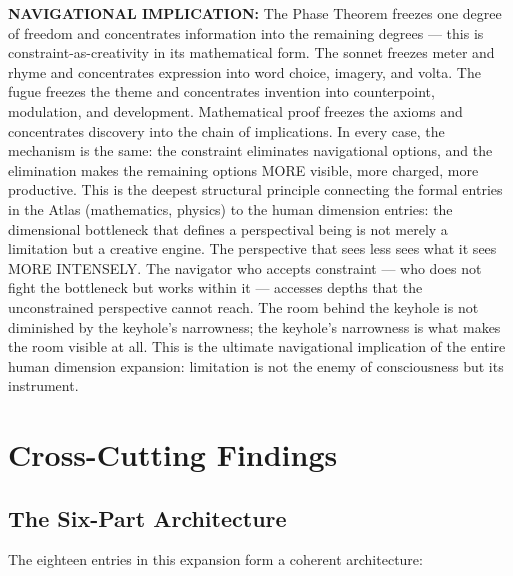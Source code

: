\textbf{NAVIGATIONAL IMPLICATION:} The Phase Theorem freezes one degree of freedom and concentrates information into the remaining degrees — this is constraint-as-creativity in its mathematical form. The sonnet freezes meter and rhyme and concentrates expression into word choice, imagery, and volta. The fugue freezes the theme and concentrates invention into counterpoint, modulation, and development. Mathematical proof freezes the axioms and concentrates discovery into the chain of implications. In every case, the mechanism is the same: the constraint eliminates navigational options, and the elimination makes the remaining options MORE visible, more charged, more productive. This is the deepest structural principle connecting the formal entries in the Atlas (mathematics, physics) to the human dimension entries: the dimensional bottleneck that defines a perspectival being is not merely a limitation but a creative engine. The perspective that sees less sees what it sees MORE INTENSELY. The navigator who accepts constraint — who does not fight the bottleneck but works within it — accesses depths that the unconstrained perspective cannot reach. The room behind the keyhole is not diminished by the keyhole's narrowness; the keyhole's narrowness is what makes the room visible at all. This is the ultimate navigational implication of the entire human dimension expansion: limitation is not the enemy of consciousness but its instrument.


\bigskip\noindent\makebox[\textwidth]{\color{rulegray}\rule{5cm}{0.3pt}}\bigskip


\section*{Cross-Cutting Findings}


\subsection*{The Six-Part Architecture}


The eighteen entries in this expansion form a coherent architecture:



